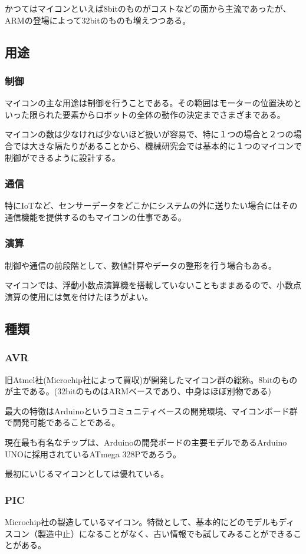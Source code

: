 \documentclass[a4paper,titlepage,here]{ujarticle}
\begin{document}
かつてはマイコンといえば8bitのものがコストなどの面から主流であったが、ARMの登場によって32bitのものも増えつつある。

\subsection{用途}
\subsubsection{制御}
マイコンの主な用途は制御を行うことである。その範囲はモーターの位置決めといった限られた要素からロボットの全体の動作の決定までさまざまである。

マイコンの数は少なければ少ないほど扱いが容易で、特に１つの場合と２つの場合では大きな隔たりがあることから、機械研究会では基本的に１つのマイコンで制御ができるように設計する。
\subsubsection{通信}
特にIoTなど、センサーデータをどこかにシステムの外に送りたい場合にはその通信機能を提供するのもマイコンの仕事である。
\subsubsection{演算}
制御や通信の前段階として、数値計算やデータの整形を行う場合もある。

マイコンでは、浮動小数点演算機を搭載していないこともままあるので、小数点演算の使用には気を付けたほうがよい。
\subsection{種類}
\subsubsection{AVR}
旧Atmel社(Microchip社によって買収)が開発したマイコン群の総称。8bitのものが主である。(32bitのものはARMベースであり、中身はほぼ別物である)

最大の特徴はArduinoというコミュニティベースの開発環境、マイコンボード群で開発可能であることである。

現在最も有名なチップは、Arduinoの開発ボードの主要モデルであるArduino UNOに採用されているATmega 328Pであろう。

最初にいじるマイコンとしては優れている。
\subsubsection{PIC}
Microchip社の製造しているマイコン。特徴として、基本的にどのモデルもディスコン（製造中止）になることがなく、古い情報でも試してみることができることがある。
\end{document}
